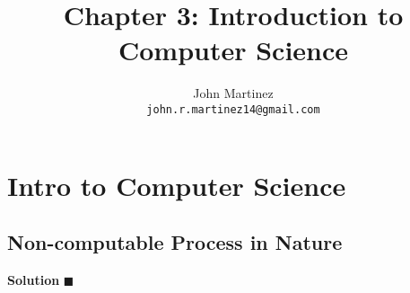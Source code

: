 \documentclass{article}
\title{Chapter 3: Introduction to Computer Science}
\author{
  John Martinez \\
  \texttt{john.r.martinez14@gmail.com} \\
}
\begin{document}
\maketitle

\section{Intro to Computer Science}
\subsection{Non-computable Process in Nature}
\textbf{Solution}
$\blacksquare$
\end{document}

